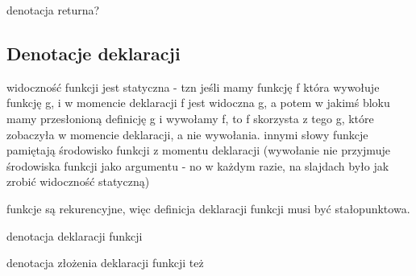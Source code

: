 \documentclass[a4paper]{article}
\begin{document}
denotacja returna?

\subsection*{Denotacje deklaracji}

widoczność funkcji jest statyczna - tzn jeśli mamy funkcję f która wywołuje funkcję g, i w momencie deklaracji f jest widoczna g, a potem w jakimś bloku mamy przesłonioną definicję g i wywołamy f, to f skorzysta z tego g, które zobaczyła w momencie deklaracji, a nie wywołania. innymi słowy funkcje pamiętają środowisko funkcji z momentu deklaracji (wywołanie nie przyjmuje środowiska funkcji jako argumentu - no w każdym razie, na slajdach było jak zrobić widoczność statyczną)

funkcje są rekurencyjne, więc definicja deklaracji funkcji musi być stałopunktowa.

denotacja deklaracji funkcji

denotacja złożenia deklaracji funkcji też
\end{document}
